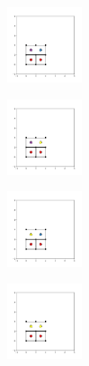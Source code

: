 \begin{figure}[bt]
	\vspace{2mm}     
	\begin{subfigure}[b]{0.19\textwidth}
         \centering
         \includegraphics[height=2.2cm]{./figures/procrystals/2x2_10.pdf}
         \caption{}
         \label{fig:et2x2_0}
     \end{subfigure}
     \hfill          
     \begin{subfigure}[b]{0.19\textwidth}
         \centering
         \includegraphics[height=2.2cm]{./figures/procrystals/2x2_11.pdf}
         \caption{}
         \label{fig:et2x2_1}
     \end{subfigure}
     \hfill
     \begin{subfigure}[b]{0.19\textwidth}
         \centering
         \includegraphics[height=2.2cm]{./figures/procrystals/2x2_15.pdf}
         \caption{}
         \label{fig:et2x2_2}
     \end{subfigure}
     \hfill
     \begin{subfigure}[b]{0.19\textwidth}
         \centering
         \includegraphics[height=2.2cm]{./figures/procrystals/2x2_16.pdf}
         \caption{}
         \label{fig:et2x2_3}
     \end{subfigure}
     \hfill
	

\end{figure}
